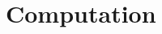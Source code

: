 \documentclass[preprint,12pt,authoryear]{elsarticle}
\theoremstyle{definition}
\begin{document}
\section{Computation}
\label{computation}




 






\end{document}
